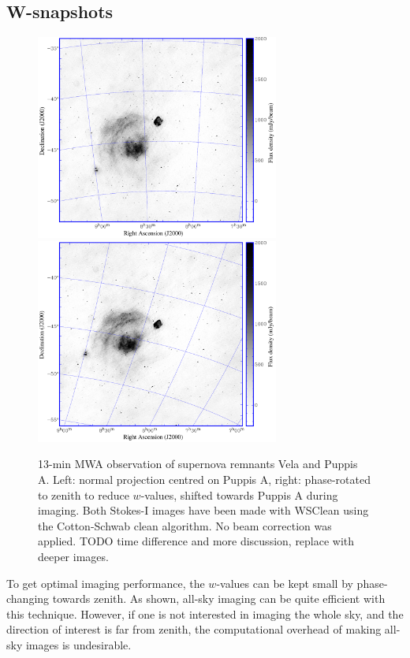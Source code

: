 \documentclass[useAMS,usenatbib]{mn2e}
\begin{document}
\subsection{W-snapshots} \label{sec:snapshot-imaging}
\begin{figure}
\begin{center}
\includegraphics[width=8cm]{img/vela-normal-projection}
\includegraphics[width=8cm]{img/vela-zenith-projection}
\caption{13-min MWA observation of supernova remnants Vela and Puppis A. Left: normal projection centred on Puppis A, right: phase-rotated to zenith to reduce $w$-values, shifted towards Puppis A during imaging. Both Stokes-I images have been made with WSClean using the Cotton-Schwab clean algorithm. No beam correction was applied. TODO time difference and more discussion, replace with deeper images.}
\label{fig:vela-projection-example}
\end{center}
\end{figure}
To get optimal imaging performance, the $w$-values can be kept small by phase-changing towards zenith. As shown, all-sky imaging can be quite efficient with this technique. However, if one is not interested in imaging the whole sky, and the direction of interest is far from zenith, the computational overhead of making all-sky images is undesirable.
\end{document}
